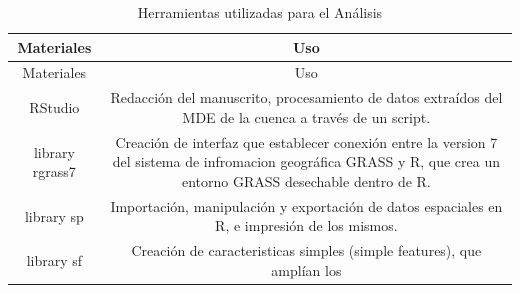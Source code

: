 \documentclass[11pt,]{article}
\begin{document}
\begin{longtable}[]{@{}cc@{}}
\caption{\label{tablanueva} Herramientas utilizadas para el
Análisis}\tabularnewline
\toprule
\begin{minipage}[b]{0.11\columnwidth}\centering\strut
Materiales\strut
\end{minipage} & \begin{minipage}[b]{0.83\columnwidth}\centering\strut
Uso\strut
\end{minipage}\tabularnewline
\midrule
\endfirsthead
\toprule
\begin{minipage}[b]{0.11\columnwidth}\centering\strut
Materiales\strut
\end{minipage} & \begin{minipage}[b]{0.83\columnwidth}\centering\strut
Uso\strut
\end{minipage}\tabularnewline
\midrule
\endhead
\begin{minipage}[t]{0.11\columnwidth}\centering\strut
RStudio\strut
\end{minipage} & \begin{minipage}[t]{0.83\columnwidth}\centering\strut
Redacción del manuscrito, procesamiento de datos extraídos del MDE de la
cuenca a través de un script.\strut
\end{minipage}\tabularnewline
\begin{minipage}[t]{0.11\columnwidth}\centering\strut
library rgrass7\strut
\end{minipage} & \begin{minipage}[t]{0.83\columnwidth}\centering\strut
Creación de interfaz que establecer conexión entre la version 7 del
sistema de infromacion geográfica GRASS y R, que crea un entorno GRASS
desechable dentro de R.\strut
\end{minipage}\tabularnewline
\begin{minipage}[t]{0.11\columnwidth}\centering\strut
library sp\strut
\end{minipage} & \begin{minipage}[t]{0.83\columnwidth}\centering\strut
Importación, manipulación y exportación de datos espaciales en R, e
impresión de los mismos.\strut
\end{minipage}\tabularnewline
\begin{minipage}[t]{0.11\columnwidth}\centering\strut
library sf\strut
\end{minipage} & \begin{minipage}[t]{0.83\columnwidth}\centering\strut
Creación de caracteristicas simples (simple features), que amplían los

\end{minipage}
\end{longtable}
\end{document}
